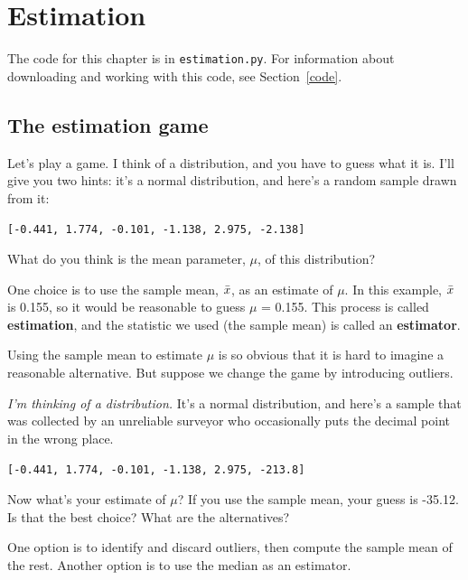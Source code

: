 \documentclass[12pt]{book}
\begin{document}
\chapter{Estimation}
\label{estimation}

The code for this chapter is in {\tt estimation.py}.  For information
about downloading and working with this code, see Section~\ref{code}.


\section{The estimation game}

Let's play a game.  I think of a distribution, and you have to guess
what it is.  I'll give you two hints: it's a
normal distribution, and here's a random sample drawn from it:

{\tt [-0.441, 1.774, -0.101, -1.138, 2.975, -2.138]}

What do you think is the mean parameter, $\mu$, of this distribution?

One choice is to use the sample mean, $\bar{x}$, as an estimate of $\mu$.
In this example, $\bar{x}$ is 0.155, so it would
be reasonable to guess $\mu$ = 0.155.
This process is called {\bf estimation}, and the statistic we used
(the sample mean) is called an {\bf estimator}.

Using the sample mean to estimate $\mu$ is so obvious that it is hard
to imagine a reasonable alternative.  But suppose we change the game by
introducing outliers.

{\em I'm thinking of a distribution.\/}  It's a normal distribution, and
here's a sample that was collected by an unreliable surveyor who
occasionally puts the decimal point in the wrong place.

{\tt [-0.441, 1.774, -0.101, -1.138, 2.975, -213.8]}

Now what's your estimate of $\mu$?  If you use the sample mean, your
guess is -35.12.  Is that the best choice?  What are the alternatives?

One option is to identify and discard outliers, then compute the sample
mean of the rest.  Another option is to use the median as an estimator.
\end{document}
